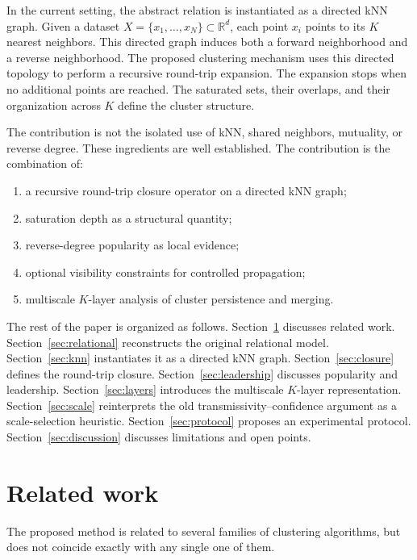 \documentclass[11pt,a4paper]{article}
\newcommand{\R}{\mathbb{R}}
\begin{document}
In the current setting, the abstract relation is instantiated as a directed kNN graph. Given a dataset $X=\{x_1,\ldots,x_N\}\subset\R^d$, each point $x_i$ points to its $K$ nearest neighbors. This directed graph induces both a forward neighborhood and a reverse neighborhood. The proposed clustering mechanism uses this directed topology to perform a recursive round-trip expansion. The expansion stops when no additional points are reached. The saturated sets, their overlaps, and their organization across $K$ define the cluster structure.

The contribution is not the isolated use of kNN, shared neighbors, mutuality, or reverse degree. These ingredients are well established. The contribution is the combination of:

\begin{enumerate}
    \item a recursive round-trip closure operator on a directed kNN graph;
    \item saturation depth as a structural quantity;
    \item reverse-degree popularity as local evidence;
    \item optional visibility constraints for controlled propagation;
    \item multiscale $K$-layer analysis of cluster persistence and merging.
\end{enumerate}

The rest of the paper is organized as follows. Section~\ref{sec:related} discusses related work. Section~\ref{sec:relational} reconstructs the original relational model. Section~\ref{sec:knn} instantiates it as a directed kNN graph. Section~\ref{sec:closure} defines the round-trip closure. Section~\ref{sec:leadership} discusses popularity and leadership. Section~\ref{sec:layers} introduces the multiscale $K$-layer representation. Section~\ref{sec:scale} reinterprets the old transmissivity--confidence argument as a scale-selection heuristic. Section~\ref{sec:protocol} proposes an experimental protocol. Section~\ref{sec:discussion} discusses limitations and open points.

\section{Related work}
\label{sec:related}

The proposed method is related to several families of clustering algorithms, but does not coincide exactly with any single one of them.
\end{document}
